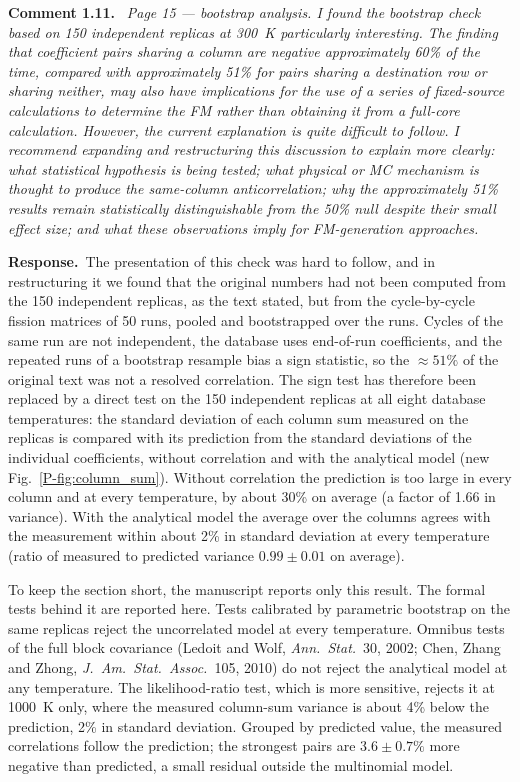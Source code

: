 \documentclass[11pt]{article}
\newenvironment{revcomment}[1]
  {\par\medskip\noindent\textbf{Comment #1.}\ \itshape}
  {\par}
\newcommand{\response}{\par\noindent\textbf{Response.}\ }
\begin{document}
\begin{revcomment}{1.11}
Page 15 --- bootstrap analysis. I found the bootstrap check based on 150 independent
replicas at 300~K particularly interesting. The finding that coefficient pairs sharing a
column are negative approximately 60\% of the time, compared with approximately 51\% for
pairs sharing a destination row or sharing neither, may also have implications for the
use of a series of fixed-source calculations to determine the FM rather than obtaining it
from a full-core calculation. However, the current explanation is quite difficult to
follow. I recommend expanding and restructuring this discussion to explain more clearly:
what statistical hypothesis is being tested; what physical or MC mechanism is thought to
produce the same-column anticorrelation; why the approximately 51\% results remain
statistically distinguishable from the 50\% null despite their small effect size; and
what these observations imply for FM-generation approaches.
\end{revcomment}
\response The presentation of this check was hard to follow, and in restructuring it we found that the original numbers had not been computed from the 150 independent replicas, as the text stated, but from the cycle-by-cycle fission matrices of 50 runs, pooled and bootstrapped over the runs. Cycles of the same run are not independent, the database uses end-of-run coefficients, and the repeated runs of a bootstrap resample bias a sign statistic, so the $\approx51\%$ of the original text was not a resolved correlation. The sign test has therefore been replaced by a direct test on the 150 independent replicas at all eight database temperatures: the standard deviation of each column sum measured on the replicas is compared with its prediction from the standard deviations of the individual coefficients, without correlation and with the analytical model (new Fig.~\ref{P-fig:column_sum}). Without correlation the prediction is too large in every column and at every temperature, by about 30\% on average (a factor of 1.66 in variance). With the analytical model the average over the columns agrees with the measurement within about 2\% in standard deviation at every temperature (ratio of measured to predicted variance $0.99\pm0.01$ on average).

To keep the section short, the manuscript reports only this result. The formal tests behind it are reported here. Tests calibrated by parametric bootstrap on the same replicas reject the uncorrelated model at every temperature. Omnibus tests of the full block covariance (Ledoit and Wolf, \emph{Ann.\ Stat.}\ 30, 2002; Chen, Zhang and Zhong, \emph{J.\ Am.\ Stat.\ Assoc.}\ 105, 2010) do not reject the analytical model at any temperature. The likelihood-ratio test, which is more sensitive, rejects it at 1000~K only, where the measured column-sum variance is about 4\% below the prediction, 2\% in standard deviation. Grouped by predicted value, the measured correlations follow the prediction; the strongest pairs are $3.6\pm0.7\%$ more negative than predicted, a small residual outside the multinomial model.
\end{document}

